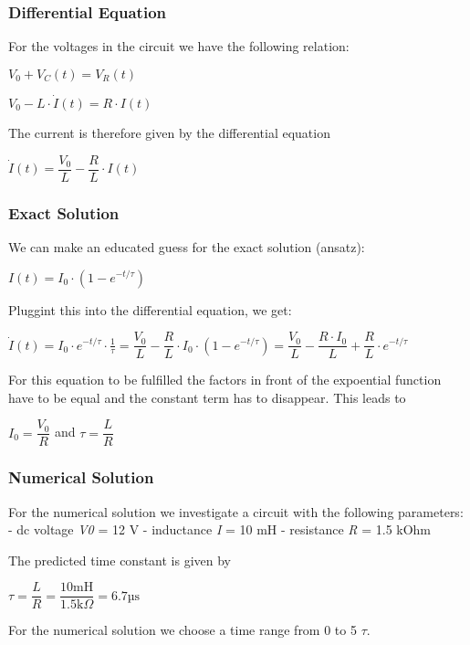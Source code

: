 \documentclass[11pt]{article}
\begin{document}
\hypertarget{differential-equation}{%
\subsubsection{Differential Equation}\label{differential-equation}}

For the voltages in the circuit we have the following relation:

\(V_0+V_C(t)=V_R(t)\)

\(V_0-L\cdot \dot I(t)=R\cdot I(t)\)

The current is therefore given by the differential equation

\(\dot I(t)=\dfrac{V_0}{L}-\dfrac{R}{L}\cdot I(t)\)

\hypertarget{exact-solution}{%
\subsubsection{Exact Solution}\label{exact-solution}}

We can make an educated guess for the exact solution (ansatz):

\(I(t)=I_0\cdot\left(1-e^{-t/\tau}\right)\)

Pluggint this into the differential equation, we get:

\(\dot I(t)=I_0\cdot e^{-t/\tau}\cdot \frac{1}{\tau}=\dfrac{V_0}{L}-\dfrac{R}{L}\cdot I_0\cdot\left(1-e^{-t/\tau}\right)=\dfrac{V_0}{L}-\dfrac{R\cdot I_0}{L}+\dfrac{R}{L}\cdot e^{-t/\tau}\)

For this equation to be fulfilled the factors in front of the expoential
function have to be equal and the constant term has to disappear. This
leads to

\(I_0=\dfrac{V_0}{R}\) and \(\tau=\dfrac{L}{R}\)

    \hypertarget{numerical-solution}{%
\subsubsection{Numerical Solution}\label{numerical-solution}}

For the numerical solution we investigate a circuit with the following
parameters: - dc voltage \emph{V0} = 12 V - inductance \emph{I} = 10 mH
- resistance \emph{R} = 1.5 kOhm

The predicted time constant is given by

\(\tau = \dfrac{L}{R} = \dfrac{\mathrm{10 mH}}{\mathrm{1.5 k}\Omega} = \mathrm{6.7 µs}\)

For the numerical solution we choose a time range from 0 to 5 \(\tau\).
\end{document}
